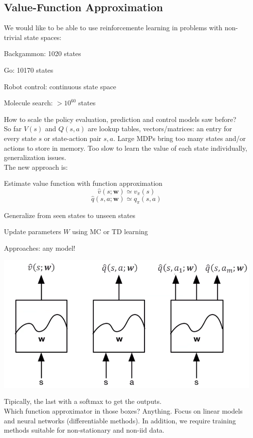 \documentclass[10pt]{report}
\begin{document}
\subsection{Value-Function Approximation}
We would like to be able to use reinforcemente learning in problems with non-trivial state spaces:\begin{list}{}{}
	\item Backgammon: 1020 states
	\item Go: 10170 states
	\item Robot control: continuous state space
	\item Molecule search: $>10^{60}$ states
\end{list}
How to scale the policy evaluation, prediction and control models saw before?\\
So far $V(s)$ and $Q(s,a)$ are lookup tables, vectors/matrices: an entry for every state $s$ or state-action pair $s,a$. Large MDPs bring too many states and/or actions to store in memory. Too slow to learn the value of each state individually, generalization issues.\\
The new approach is:
\begin{list}{}{}
	\item Estimate value function with function approximation 
	$$\hat{v}(s;\mathbf{w})\simeq v_\pi(s)$$
	$$\hat{q}(s,a;\mathbf{w})\simeq q_\pi(s,a)$$
	\item Generalize from seen states to unseen states
	\item Update parameters $W$ using MC or TD learning
\end{list}
Approaches: any model!
\begin{center}
	\includegraphics[scale=0.5]{176.png}
\end{center}
Tipically, the last with a softmax to get the outputs.\\
Which function approximator in those boxes? Anything. Focus on linear models and neural networks (differentiable methods). In addition, we require training methods suitable for non-stationary and non-iid data.
\end{document}
